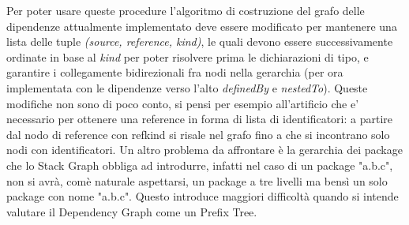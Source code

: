 Per poter usare queste procedure l'algoritmo di costruzione del grafo delle dipendenze attualmente implementato deve essere modificato per mantenere una lista delle tuple \emph{(source, reference, kind)}, le quali devono essere successivamente ordinate in base al \emph{kind} per poter risolvere prima le dichiarazioni di tipo, e garantire i collegamente bidirezionali fra nodi nella gerarchia (per ora implementata con le dipendenze verso l'alto \emph{definedBy} e \emph{nestedTo}). Queste modifiche non sono di poco conto, si pensi per esempio all'artificio che e' necessario per ottenere una reference in forma di lista di identificatori: a partire dal nodo di reference con refkind si risale nel grafo fino a che si incontrano solo nodi con identificatori. Un altro problema da affrontare \`e la gerarchia dei package che lo Stack Graph obbliga ad introdurre, infatti nel caso di un package "a.b.c", non si avr\`a, com\`e naturale aspettarsi, un package a tre livelli ma bens\`i un solo package con nome "a.b.c". Questo introduce maggiori difficolt\`a quando si intende valutare il Dependency Graph come un Prefix Tree.

